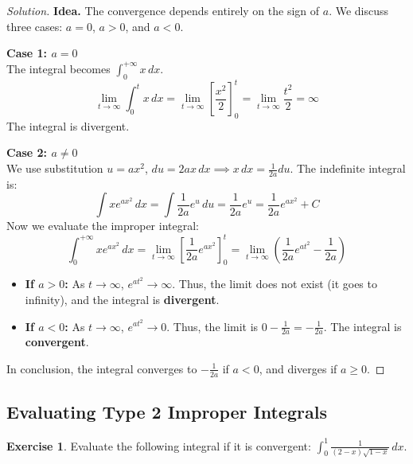 \documentclass[11pt]{article}
\theoremstyle{definition}
\newtheorem{exercise}{Exercise}[section]
\newenvironment{solution}{\begin{proof}[Solution]}{\end{proof}}
\begin{document}
\begin{solution}
\textbf{Idea.} The convergence depends entirely on the sign of $a$. We discuss three cases: $a=0$, $a>0$, and $a<0$.

\textbf{Case 1: $a = 0$} \\
The integral becomes $\int_0^{+\infty} x \,dx$.
\[
\lim_{t \to \infty} \int_0^t x \,dx = \lim_{t \to \infty} \left[ \frac{x^2}{2} \right]_0^t = \lim_{t \to \infty} \frac{t^2}{2} = \infty
\]
The integral is divergent.

\textbf{Case 2: $a \neq 0$} \\
We use substitution $u = ax^2$, $du = 2ax \,dx \implies x\,dx = \frac{1}{2a}du$.
The indefinite integral is:
\[
\int xe^{ax^2}\,dx = \int \frac{1}{2a} e^u \,du = \frac{1}{2a} e^u = \frac{1}{2a} e^{ax^2} + C
\]
Now we evaluate the improper integral:
\[
\int_0^{+\infty} xe^{ax^2}\,dx = \lim_{t \to \infty} \left[ \frac{1}{2a} e^{ax^2} \right]_0^t = \lim_{t \to \infty} \left( \frac{1}{2a} e^{at^2} - \frac{1}{2a} \right)
\]
\begin{itemize}
    \item \textbf{If $a > 0$:} As $t \to \infty$, $e^{at^2} \to \infty$. Thus, the limit does not exist (it goes to infinity), and the integral is \textbf{divergent}.
    \item \textbf{If $a < 0$:} As $t \to \infty$, $e^{at^2} \to 0$. Thus, the limit is $0 - \frac{1}{2a} = -\frac{1}{2a}$. The integral is \textbf{convergent}.
\end{itemize}

In conclusion, the integral converges to $-\frac{1}{2a}$ if $a < 0$, and diverges if $a \ge 0$.
\end{solution}

\subsection{Evaluating Type 2 Improper Integrals}

\begin{exercise}
Evaluate the following integral if it is convergent: $\displaystyle \int_0^1\frac{1}{(2-x)\sqrt{1-x}}\,dx$.
\end{exercise}
\end{document}
